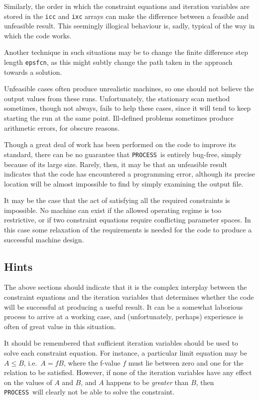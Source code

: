 \documentclass[11pt,a4paper]{report}
\newcommand{\process}{\mbox{\texttt{PROCESS}}}
\begin{document}
Similarly, the order in which the constraint equations and iteration variables
are stored in the \texttt{icc} and \texttt{ixc} arrays can make the difference
between a feasible and unfeasible result. This seemingly illogical behaviour
is, sadly, typical of the way in which the code works.

Another technique in such situations may be to change the finite difference
step length \texttt{epsfcn}, as this might subtly change the path taken in the
approach towards a solution.

Unfeasible cases often produce unrealistic machines, so one should not believe
the output values from these runs. Unfortunately, the stationary scan method
sometimes, though not always, fails to help these cases, since it will tend to
keep starting the run at the same point. Ill-defined problems sometimes
produce arithmetic errors, for obscure reasons.

Though a great deal of work has been performed on the code to improve its
standard, there can be no guarantee that \process\ is entirely bug-free,
simply because of its large size. Rarely, then, it may be that an unfeasible
result indicates that the code has encountered a programming error, although
its precise location will be almost impossible to find by simply examining the
output file.

It may be the case that the act of satisfying all the required constraints is
impossible. No machine can exist if the allowed operating regime is too
restrictive, or if two constraint equations require conflicting parameter
spaces. In this case some relaxation of the requirements is needed for the
code to produce a successful machine design.

\subsection{Hints}

The above sections should indicate that it is the complex interplay between
the constraint equations and the iteration variables that determines whether
the code will be successful at producing a useful result. It can be a somewhat
laborious process to arrive at a working case, and (unfortunately, perhaps)
experience is often of great value in this situation.

It should be remembered that sufficient iteration variables should be used to
solve each constraint equation. For instance, a particular limit equation may
be $A \leq B$, i.e.\ $A = fB$, where the f-value $f$ must lie between zero and
one for the relation to be satisfied.  However, if none of the iteration
variables have any effect on the values of $A$ and $B$, and $A$ happens to be
\textit{greater}\/ than $B$, then \process\ will clearly not be able to solve
the constraint.
\end{document}
